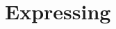 \documentclass[runningheads]{llncs}
\newcommand{\lang}{Rhyme}
\begin{document}



%
%




\appendix
\section{Expressing }

\end{document}
